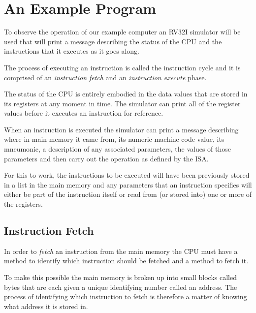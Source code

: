 \section{An Example Program}

To observe the operation of our example computer an RV32I simulator 
will be used that will print a message describing the status of the 
CPU and the instructions that it executes as it goes along.

The process of executing an instruction is called the
 instruction cycle and it is comprised
of an {\em instruction fetch} and an {\em instruction execute} phase.
 
The status of the CPU is entirely embodied in the data values that
are stored in its registers at any moment in time.  The simulator 
can print all of the register values before it executes an instruction 
for reference.

When an instruction is executed the simulator can print a message
describing where in main memory it came from, its numeric machine code 
value, its mneumonic, a description of any associated parameters, 
the values of those parameters and then carry out the operation as 
defined by the ISA.

For this to work, the instructions to be executed will have been 
previously stored in a list in the main memory and any parameters that 
an instruction specifies will either be part of the instruction itself 
or read from (or stored into) one or more of the registers.


\subsection{Instruction Fetch}

In order to {\em fetch} an instruction from the main memory the CPU
must have a method to identify which instruction should be fetched and
a method to fetch it. 

To make this possible the main memory is broken up into small blocks
called \gls{byte}s that are each given a unique identifying number 
called an \gls{address}.  The process of identifying which instruction
to fetch is therefore a matter of knowing what address it is stored in.

